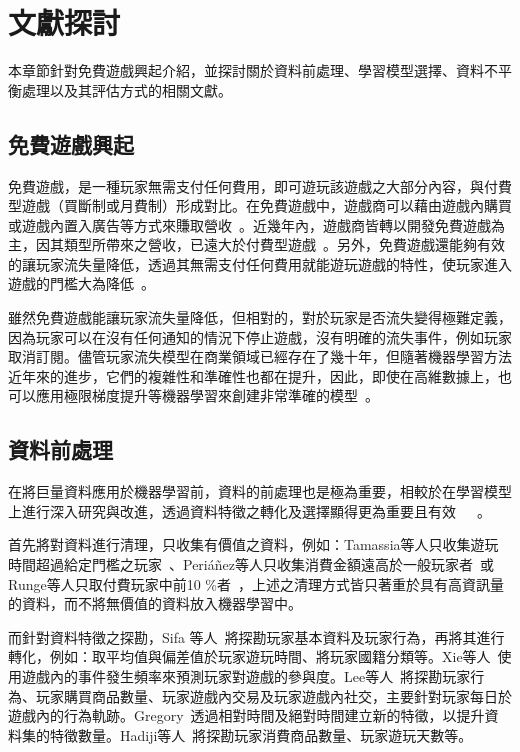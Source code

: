 \chapter{文獻探討}
\label{cha:RelatedWork}

本章節針對免費遊戲興起介紹，並探討關於資料前處理、學習模型選擇、資料不平衡處理以及其評估方式的相關文獻。

\section{免費遊戲興起}

免費遊戲，是一種玩家無需支付任何費用，即可遊玩該遊戲之大部分內容，與付費型遊戲（買斷制或月費制）形成對比。在免費遊戲中，遊戲商可以藉由遊戲內購買或遊戲內置入廣告等方式來賺取營收~\cite{wiki:f2p}。近幾年內，遊戲商皆轉以開發免費遊戲為主，因其類型所帶來之營收，已遠大於付費型遊戲~\cite{lee2018game}。另外，免費遊戲還能夠有效的讓玩家流失量降低，透過其無需支付任何費用就能遊玩遊戲的特性，使玩家進入遊戲的門檻大為降低~\cite{10.1007/978-3-030-27355-2_10}。

雖然免費遊戲能讓玩家流失量降低，但相對的，對於玩家是否流失變得極難定義，因為玩家可以在沒有任何通知的情況下停止遊戲，沒有明確的流失事件，例如玩家取消訂閱。儘管玩家流失模型在商業領域已經存在了幾十年，但隨著機器學習方法近年來的進步，它們的複雜性和準確性也都在提升，因此，即使在高維數據上，也可以應用極限梯度提升等機器學習來創建非常準確的模型~\cite{XGBoostTemporalData}。

\section{資料前處理}

在將巨量資料應用於機器學習前，資料的前處理也是極為重要，相較於在學習模型上進行深入研究與改進，透過資料特徵之轉化及選擇顯得更為重要且有效~\cite{SupervisedMachineLearning}~\cite{lee2018game}~\cite{XGBoostTemporalData}。

首先將對資料進行清理，只收集有價值之資料，例如：Tamassia等人只收集遊玩時間超過給定門檻之玩家~\cite{tamassia2016predicting}、Periáñez等人只收集消費金額遠高於一般玩家者~\cite{perianez2016churn}或Runge等人只取付費玩家中前10 \%者~\cite{runge2014churn}，上述之清理方式皆只著重於具有高資訊量的資料，而不將無價值的資料放入機器學習中。

而針對資料特徵之探勘，Sifa 等人~\cite{sifa2015predicting}將探勘玩家基本資料及玩家行為，再將其進行轉化，例如：取平均值與偏差值於玩家遊玩時間、將玩家國籍分類等。Xie等人~\cite{PredictionWithEventFrequency}使用遊戲內的事件發生頻率來預測玩家對遊戲的參與度。Lee等人~\cite{lee2016predicting}將探勘玩家行為、玩家購買商品數量、玩家遊戲內交易及玩家遊戲內社交，主要針對玩家每日於遊戲內的行為軌跡。Gregory~\cite{XGBoostTemporalData}透過相對時間及絕對時間建立新的特徵，以提升資料集的特徵數量。Hadiji等人~\cite{6932876}將探勘玩家消費商品數量、玩家遊玩天數等。

